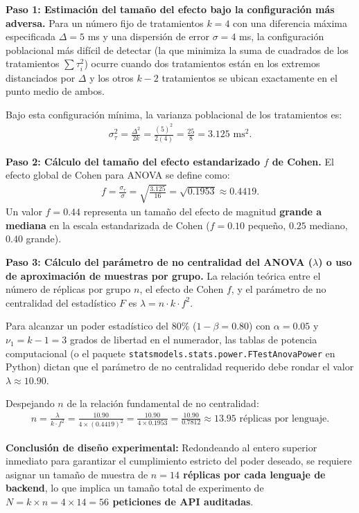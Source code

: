\begin{solproblema}
	\textbf{Paso 1: Estimación del tamaño del efecto bajo la configuración más adversa.}
	Para un número fijo de tratamientos $k = 4$ con una diferencia máxima especificada $\Delta = 5$ ms y una dispersión de error $\sigma = 4$ ms, la configuración poblacional más difícil de detectar (la que minimiza la suma de cuadrados de los tratamientos $\sum \tau_i^2$) ocurre cuando dos tratamientos están en los extremos distanciados por $\Delta$ y los otros $k-2$ tratamientos se ubican exactamente en el punto medio de ambos.
	
	Bajo esta configuración mínima, la varianza poblacional de los tratamientos es:
	\begin{align}
		\sigma_{\tau}^2 = \frac{\Delta^2}{2k} = \frac{(5)^2}{2(4)} = \frac{25}{8} = 3.125 \text{ ms}^2.
	\end{align}
	
	\textbf{Paso 2: Cálculo del tamaño del efecto estandarizado $f$ de Cohen.}
	El efecto global de Cohen para ANOVA se define como:
	\begin{align}
		f = \frac{\sigma_{\tau}}{\sigma} = \sqrt{\frac{3.125}{16}} = \sqrt{0.1953} \approx 0.4419.
	\end{align}
	Un valor $f = 0.44$ representa un tamaño del efecto de magnitud \textbf{grande a mediana} en la escala estandarizada de Cohen ($f=0.10$ pequeño, $0.25$ mediano, $0.40$ grande).
	
	\textbf{Paso 3: Cálculo del parámetro de no centralidad del ANOVA ($\lambda$) o uso de aproximación de muestras por grupo.}
	La relación teórica entre el número de réplicas por grupo $n$, el efecto de Cohen $f$, y el parámetro de no centralidad del estadístico $F$ es $\lambda = n \cdot k \cdot f^2$.
	
	Para alcanzar un poder estadístico del $80\%$ ($1 - \beta = 0.80$) con $\alpha = 0.05$ y $\nu_1 = k - 1 = 3$ grados de libertad en el numerador, las tablas de potencia computacional (o el paquete \texttt{statsmodels.stats.power.FTestAnovaPower} en Python) dictan que el parámetro de no centralidad requerido debe rondar el valor $\lambda \approx 10.90$.
	
	Despejando $n$ de la relación fundamental de no centralidad:
	\begin{align}
		n = \frac{\lambda}{k \cdot f^2} = \frac{10.90}{4 \times (0.4419)^2} = \frac{10.90}{4 \times 0.1953} = \frac{10.90}{0.7812} \approx 13.95 \text{ réplicas por lenguaje}.
	\end{align}
	
	\textbf{Conclusión de diseño experimental:} Redondeando al entero superior inmediato para garantizar el cumplimiento estricto del poder deseado, se requiere asignar un tamaño de muestra de \textbf{$n = 14$ réplicas por cada lenguaje de backend}, lo que implica un tamaño total de experimento de \textbf{$N = k \times n = 4 \times 14 = 56$ peticiones de API auditadas}.
\end{solproblema}

